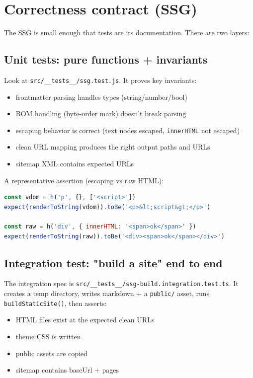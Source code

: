 \section{Correctness contract (SSG)}
The SSG is small enough that tests are its documentation.
There are two layers:

\subsection{Unit tests: pure functions + invariants}
Look at \texttt{src/\_\_tests\_\_/ssg.test.js}.
It proves key invariants:

\begin{itemize}
  \item frontmatter parsing handles types (string/number/bool)
  \item BOM handling (byte-order mark) doesn't break parsing
  \item escaping behavior is correct (text nodes escaped, \texttt{innerHTML} not escaped)
  \item clean URL mapping produces the right output paths and URLs
  \item sitemap XML contains expected URLs
\end{itemize}

A representative assertion (escaping vs raw HTML):

\begin{lstlisting}[style=relax,language=JavaScript,caption={Escaping is the default; \texttt{innerHTML} is an explicit escape hatch.}]
const vdom = h('p', {}, ['<script>'])
expect(renderToString(vdom)).toBe('<p>&lt;script&gt;</p>')

const raw = h('div', { innerHTML: '<span>ok</span>' })
expect(renderToString(raw)).toBe('<div><span>ok</span></div>')
\end{lstlisting}

\subsection{Integration test: "build a site" end to end}
The integration spec is \texttt{src/\_\_tests\_\_/ssg-build.integration.test.ts}.
It creates a temp directory, writes markdown + a \texttt{public/} asset, runs \texttt{buildStaticSite()}, then asserts:

\begin{itemize}
  \item HTML files exist at the expected clean URLs
  \item theme CSS is written
  \item public assets are copied
  \item sitemap contains baseUrl + pages
\end{itemize}


